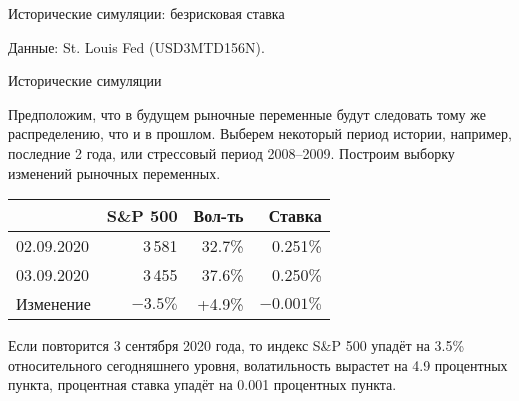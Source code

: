 \documentclass{beamer}
\begin{document}
\begin{frame}{Исторические симуляции: безрисковая ставка}
\centering
{}

\centering
\small Данные: St. Louis Fed (USD3MTD156N).
\end{frame}



\begin{frame}{Исторические симуляции}

\justify
Предположим, что в будущем рыночные переменные будут следовать тому же распределению, что и в прошлом. Выберем некоторый период истории, например, последние 2 года, или стрессовый период 2008--2009. Построим выборку изменений рыночных переменных.
 
\justify
\centering
\begin{tabular}{l|r|r|r}
           & S\&P 500 & Вол-ть   & Ставка \\ \hline
02.09.2020 & 3\,581   & 32.7\%   & 0.251\% \\
03.09.2020 & 3\,455   & 37.6\%   & 0.250\% \\ \hline
Изменение  & $-3.5\%$ & +4.9\%   & $-0.001\%$ 
\end{tabular}

\justify
Если повторится 3 сентября 2020 года, то индекс S\&P 500 упадёт на 3.5\% относительного \alert{сегодняшнего} уровня, волатильность вырастет на 4.9 процентных пункта, процентная ставка упадёт на 0.001 процентных пункта.

\end{frame}
\end{document}
